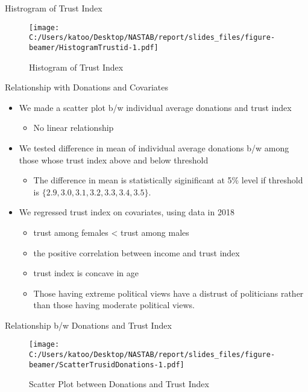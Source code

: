 \documentclass[
  ignorenonframetext,
]{beamer}
\providecommand{\tightlist}{%
  \setlength{\itemsep}{0pt}\setlength{\parskip}{0pt}}
\begin{document}
\begin{frame}{Histrogram of Trust Index}
\protect\hypertarget{histrogram-of-trust-index}{}
\begin{figure}
\centering
\texttt{[image: C:/Users/katoo/Desktop/NASTAB/report/slides\_files/figure-beamer/HistogramTrustid-1.pdf]}
\caption{Histogram of Trust Index}
\end{figure}
\end{frame}

\begin{frame}{Relationship with Donations and Covariates}
\protect\hypertarget{relationship-with-donations-and-covariates}{}
\begin{itemize}
\tightlist
\item
  We made a scatter plot b/w individual average donations and trust
  index

  \begin{itemize}
  \tightlist
  \item
    No linear relationship
  \end{itemize}
\item
  We tested difference in mean of individual average donations b/w among
  those whose trust index above and below threshold

  \begin{itemize}
  \tightlist
  \item
    The difference in mean is statistically siginificant at 5\% level if
    threshold is \(\{2.9, 3.0, 3.1, 3.2, 3.3, 3.4, 3.5\}\).
  \end{itemize}
\item
  We regressed trust index on covariates, using data in 2018

  \begin{itemize}
  \tightlist
  \item
    trust among females \textless{} trust among males
  \item
    the positive correlation between income and trust index
  \item
    trust index is concave in age
  \item
    Those having extreme political views have a distrust of politicians
    rather than those having moderate political views.
  \end{itemize}
\end{itemize}
\end{frame}

\begin{frame}{Relationship b/w Donations and Trust Index}
\protect\hypertarget{relationship-bw-donations-and-trust-index}{}
\begin{figure}
\centering
\texttt{[image: C:/Users/katoo/Desktop/NASTAB/report/slides\_files/figure-beamer/ScatterTrusidDonations-1.pdf]}
\caption{Scatter Plot between Donations and Trust Index}
\end{figure}
\end{frame}
\end{document}
